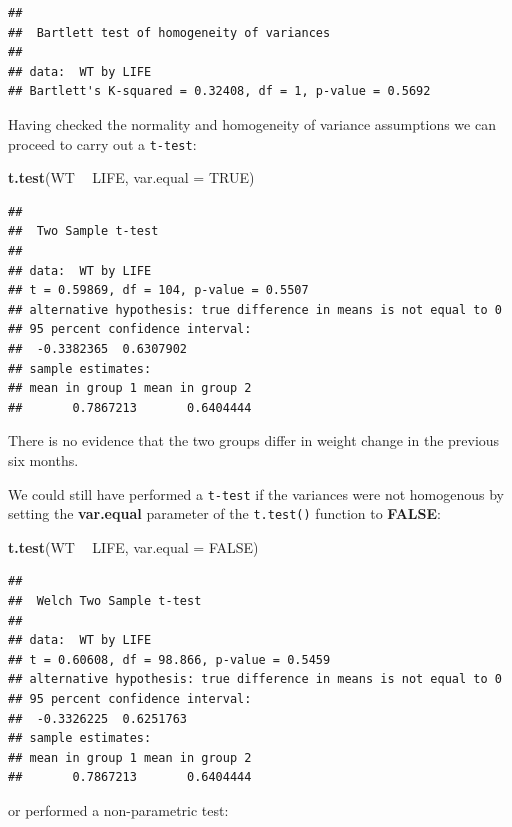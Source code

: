 \documentclass[12pt,]{book}
\newenvironment{Shaded}{\begin{snugshade}}{\end{snugshade}}
\newcommand{\KeywordTok}[1]{\textcolor[rgb]{0.13,0.29,0.53}{\textbf{#1}}}
\newcommand{\DataTypeTok}[1]{\textcolor[rgb]{0.13,0.29,0.53}{#1}}
\newcommand{\StringTok}[1]{\textcolor[rgb]{0.31,0.60,0.02}{#1}}
\newcommand{\OtherTok}[1]{\textcolor[rgb]{0.56,0.35,0.01}{#1}}
\newcommand{\OperatorTok}[1]{\textcolor[rgb]{0.81,0.36,0.00}{\textbf{#1}}}
\newcommand{\NormalTok}[1]{#1}
\theoremstyle{definition}
\theoremstyle{definition}
\theoremstyle{definition}
\theoremstyle{remark}
\begin{document}
\begin{verbatim}
## 
##  Bartlett test of homogeneity of variances
## 
## data:  WT by LIFE
## Bartlett's K-squared = 0.32408, df = 1, p-value = 0.5692
\end{verbatim}

Having checked the normality and homogeneity of variance assumptions we
can proceed to carry out a \texttt{t-test}:

\begin{Shaded}
\begin{Highlighting}[]
\KeywordTok{t.test}\NormalTok{(WT }\OperatorTok{~}\StringTok{ }\NormalTok{LIFE, }\DataTypeTok{var.equal =} \OtherTok{TRUE}\NormalTok{)}
\end{Highlighting}
\end{Shaded}

\begin{verbatim}
## 
##  Two Sample t-test
## 
## data:  WT by LIFE
## t = 0.59869, df = 104, p-value = 0.5507
## alternative hypothesis: true difference in means is not equal to 0
## 95 percent confidence interval:
##  -0.3382365  0.6307902
## sample estimates:
## mean in group 1 mean in group 2 
##       0.7867213       0.6404444
\end{verbatim}

There is no evidence that the two groups differ in weight change in the
previous six months.

We could still have performed a \texttt{t-test} if the variances were
not homogenous by setting the \textbf{var.equal} parameter of the
\texttt{t.test()} function to \textbf{FALSE}:

\begin{Shaded}
\begin{Highlighting}[]
\KeywordTok{t.test}\NormalTok{(WT }\OperatorTok{~}\StringTok{ }\NormalTok{LIFE, }\DataTypeTok{var.equal =} \OtherTok{FALSE}\NormalTok{)}
\end{Highlighting}
\end{Shaded}

\begin{verbatim}
## 
##  Welch Two Sample t-test
## 
## data:  WT by LIFE
## t = 0.60608, df = 98.866, p-value = 0.5459
## alternative hypothesis: true difference in means is not equal to 0
## 95 percent confidence interval:
##  -0.3326225  0.6251763
## sample estimates:
## mean in group 1 mean in group 2 
##       0.7867213       0.6404444
\end{verbatim}

or performed a non-parametric test:
\end{document}
